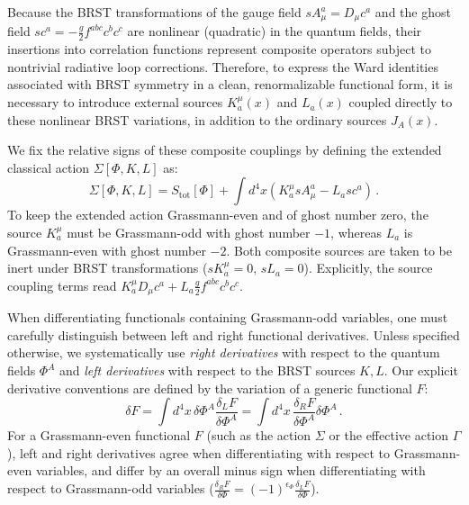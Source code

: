 Because the BRST transformations of the gauge field \(sA_\mu^a = D_\mu c^a\) and the ghost field \(sc^a = -\frac{g}{2}f^{abc}c^b c^c\) are nonlinear (quadratic) in the quantum fields, their insertions into correlation functions represent composite operators subject to nontrivial radiative loop corrections. Therefore, to express the Ward identities associated with BRST symmetry in a clean, renormalizable functional form, it is necessary to introduce external sources \(K_a^\mu(x)\) and \(L_a(x)\) coupled directly to these nonlinear BRST variations, in addition to the ordinary sources \(J_A(x)\).

We fix the relative signs of these composite couplings by defining the extended classical action \(\Sigma[\Phi, K, L]\) as:
\begin{equation} \label{eq:extended_classical_action}
    \Sigma[\Phi, K, L] = S_{\text{tot}}[\Phi] + \int d^4x \left( K_a^\mu sA_\mu^a - L_a sc^a \right) \, .
\end{equation}
To keep the extended action Grassmann-even and of ghost number zero, the source \(K_a^\mu\) must be Grassmann-odd with ghost number \(-1\), whereas \(L_a\) is Grassmann-even with ghost number \(-2\). Both composite sources are taken to be inert under BRST transformations (\(sK_a^\mu = 0, \, sL_a = 0\)). Explicitly, the source coupling terms read \(K_a^\mu D_\mu c^a + L_a \frac{g}{2} f^{abc} c^b c^c\).

When differentiating functionals containing Grassmann-odd variables, one must carefully distinguish between left and right functional derivatives. Unless specified otherwise, we systematically use \textit{right derivatives} with respect to the quantum fields \(\Phi^A\) and \textit{left derivatives} with respect to the BRST sources \(K, L\). Our explicit derivative conventions are defined by the variation of a generic functional \(F\):
\begin{equation} \label{eq:left_right_derivatives}
    \delta F = \int d^4x \, \delta \Phi^A \frac{\delta_L F}{\delta \Phi^A} = \int d^4x \, \frac{\delta_R F}{\delta \Phi^A} \delta \Phi^A \, .
\end{equation}
For a Grassmann-even functional \(F\) (such as the action \(\Sigma\) or the effective action \(\Gamma\)), left and right derivatives agree when differentiating with respect to Grassmann-even variables, and differ by an overall minus sign when differentiating with respect to Grassmann-odd variables (\(\frac{\delta_R F}{\delta \Phi} = (-1)^{\epsilon_\Phi} \frac{\delta_L F}{\delta \Phi}\)).

